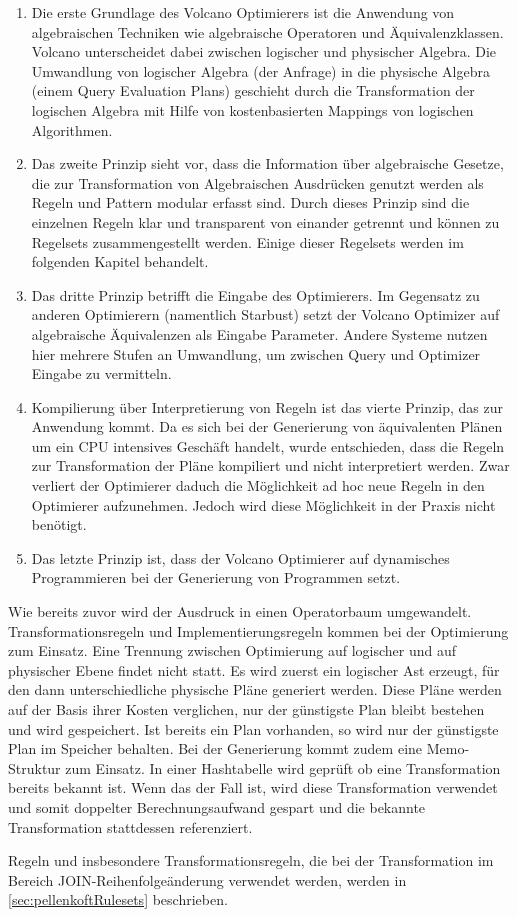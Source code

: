 \begin{enumerate}

\item Die erste Grundlage des Volcano Optimierers ist die Anwendung von algebraischen Techniken wie algebraische Operatoren und Äquivalenzklassen. Volcano unterscheidet dabei zwischen logischer und physischer Algebra. Die Umwandlung von logischer Algebra (der Anfrage) in die physische Algebra (einem Query Evaluation Plans) geschieht durch die Transformation der logischen Algebra mit Hilfe von kostenbasierten Mappings von logischen Algorithmen. 


\item Das zweite Prinzip sieht vor, dass die Information über algebraische Gesetze, die zur Transformation von Algebraischen Ausdrücken genutzt werden als Regeln und Pattern modular erfasst sind. Durch dieses Prinzip sind die einzelnen Regeln klar und transparent von einander getrennt und können zu Regelsets zusammengestellt werden. Einige dieser Regelsets werden im folgenden Kapitel behandelt.


\item Das dritte Prinzip betrifft die Eingabe des Optimierers. Im Gegensatz zu anderen Optimierern (namentlich Starbust) setzt der Volcano Optimizer auf algebraische Äquivalenzen als Eingabe Parameter. Andere Systeme nutzen hier mehrere Stufen an Umwandlung, um zwischen Query und Optimizer Eingabe zu vermitteln. 

\item Kompilierung über Interpretierung von Regeln ist das vierte Prinzip, das zur Anwendung kommt. Da es sich bei der Generierung von äquivalenten Plänen um ein CPU intensives Geschäft handelt, wurde entschieden, dass die Regeln zur Transformation der Pläne kompiliert und nicht interpretiert werden. Zwar verliert der Optimierer daduch die Möglichkeit ad hoc neue Regeln in den Optimierer aufzunehmen. Jedoch wird diese Möglichkeit in der Praxis nicht benötigt. 

\item Das letzte Prinzip ist, dass der Volcano Optimierer auf dynamisches Programmieren bei der Generierung von Programmen setzt. 
\end{enumerate}


Wie bereits zuvor wird der Ausdruck in einen Operatorbaum umgewandelt. Transformationsregeln und Implementierungsregeln kommen bei der Optimierung zum Einsatz. Eine Trennung zwischen Optimierung auf logischer und auf physischer Ebene findet nicht statt. Es wird zuerst ein logischer Ast erzeugt, für den dann unterschiedliche physische Pläne generiert werden. Diese Pläne werden auf der Basis ihrer Kosten verglichen, nur der günstigste Plan bleibt bestehen und wird gespeichert. Ist bereits ein Plan vorhanden, so wird nur der günstigste Plan im Speicher behalten. Bei der Generierung kommt zudem eine Memo-Struktur zum Einsatz. In einer Hashtabelle wird geprüft ob eine Transformation bereits bekannt ist. Wenn das der Fall ist, wird diese Transformation verwendet und somit doppelter Berechnungsaufwand gespart und die bekannte Transformation stattdessen referenziert.

Regeln und insbesondere Transformationsregeln, die bei der Transformation im Bereich JOIN-Reihenfolgeänderung verwendet werden, werden in \ref{sec:pellenkoftRulesets} beschrieben.

